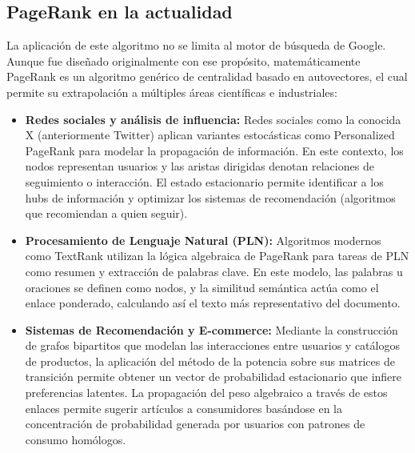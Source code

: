 \subsection{PageRank en la actualidad}
La aplicación de este algoritmo no se limita al motor de búsqueda de Google. Aunque fue diseñado originalmente con ese propósito, matemáticamente PageRank es un algoritmo genérico de centralidad basado en autovectores, 
el cual permite su extrapolación a múltiples áreas científicas e industriales:

\begin{itemize}
    \item \textbf{Redes sociales y análisis de influencia:} Redes sociales como la conocida X (anteriormente Twitter) aplican variantes estocásticas como Personalized PageRank para modelar la propagación de información. 
    En este contexto, los nodos representan usuarios y las aristas dirigidas denotan relaciones de seguimiento o interacción. El estado estacionario permite identificar a los hubs de información y optimizar los sistemas 
    de recomendación (algoritmos que recomiendan a quien seguir). \parencite{tao2021}
    \item \textbf{Procesamiento de Lenguaje Natural (PLN):} Algoritmos modernos como TextRank utilizan la lógica algebraica de PageRank para tareas de PLN como resumen y extracción de palabras clave. En este modelo, 
    las palabras u oraciones se definen como nodos, y la similitud semántica actúa como el enlace ponderado, calculando así el texto más representativo del documento. \parencite{yassine2025}
    \item \textbf{Sistemas de Recomendación y E-commerce:} Mediante la construcción de grafos bipartitos que modelan las interacciones entre usuarios y catálogos de productos, la aplicación del método de la potencia 
    sobre sus matrices de transición permite obtener un vector de probabilidad estacionario que infiere preferencias latentes. La propagación del peso algebraico a través de estos enlaces permite sugerir artículos a 
    consumidores basándose en la concentración de probabilidad generada por usuarios con patrones de consumo homólogos. \parencite{lorenzo2022}
\end{itemize}